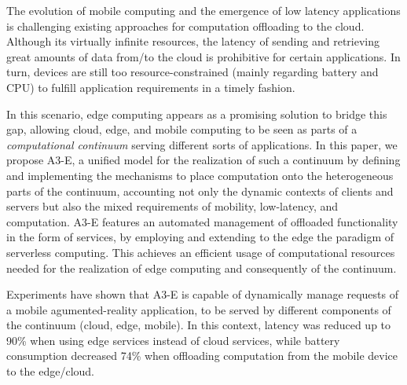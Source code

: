 
The evolution of mobile computing and the emergence of low latency applications is challenging existing approaches for computation offloading to the cloud. Although its virtually infinite resources, the latency of sending and retrieving great amounts of data from/to the cloud is prohibitive for certain applications. In turn, devices are still too resource-constrained (mainly regarding battery and CPU) to fulfill application requirements in a timely fashion.

In this scenario, edge computing appears as a promising solution to bridge this gap, allowing cloud, edge, and mobile computing to be seen as parts of a \textit{computational continuum} serving different sorts of applications. In this paper, we propose A3-E, %
a unified model for the realization of such a continuum by defining and implementing the mechanisms to place computation onto the heterogeneous parts of the continuum, accounting not only the dynamic contexts of clients and servers but also the mixed requirements of mobility, low-latency, and computation. A3-E features an automated management of offloaded functionality in the form of services, by employing and extending to the edge the paradigm of serverless computing. This achieves an efficient usage of computational resources needed for the realization of edge computing and consequently of the continuum.

Experiments have shown that A3-E is capable of dynamically manage requests of a mobile agumented-reality application, to be served by different components of the continuum (cloud, edge, mobile). In this context, latency was reduced up to 90\% when using edge services instead of cloud services, while battery consumption decreased 74\% when offloading computation from the mobile device to the edge/cloud.%


